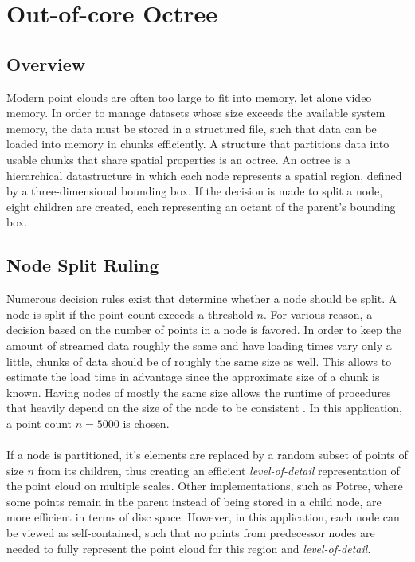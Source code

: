 \chapter{Out-of-core Octree}
\label{chap:octree}


\section{Overview}

Modern point clouds are often too large to fit into memory, let alone video memory. In order to manage datasets whose size exceeds the available system memory, the data must be stored in a structured file, such that data can be loaded into memory in chunks efficiently. A structure that partitions data into usable chunks that share spatial properties is an octree. 
An octree is a hierarchical datastructure in which each node represents a spatial region, defined by a three-dimensional bounding box. If the decision is made to split a node, eight children are created, each representing an octant of the parent's bounding box.


\section{Node Split Ruling}

Numerous decision rules exist that determine whether a node should be split. A node is split if the point count exceeds a threshold $n$.  For various reason, a decision based on the number of points in a node is favored. In order to keep the amount of streamed data roughly the same and have loading times vary only a little, chunks of data should be of roughly the same size as well. This allows to estimate the load time in advantage since the approximate size of a chunk is known. Having nodes of mostly the same size allows the runtime of procedures that heavily depend on the size of the node to be consistent . In this application, a point count $n = 5000$ is chosen. 
\\
\\
If a node is partitioned, it's elements are replaced by a random subset of points of size $n$ from its children, thus creating an efficient \textit{level-of-detail} representation of the point cloud on multiple scales. 
Other implementations, such as Potree\cite{SCHUETZ-2016-POT}, where some points remain in the parent instead of being stored in a child node, are more efficient in terms of disc space. However, in this application, each node can be viewed as self-contained, such that no points from predecessor nodes are needed to fully represent the point cloud for this region and \textit{level-of-detail}. 


